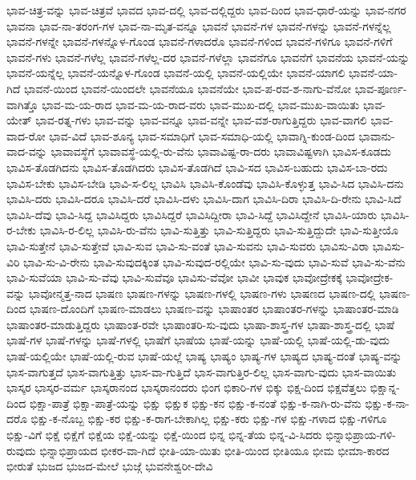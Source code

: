 {ಭಾವ-ಚಿತ್ರ-ವನ್ನು
ಭಾವ-ಚಿತ್ರವೆ
ಭಾವದ
ಭಾವ-ದಲ್ಲಿ
ಭಾವ-ದಲ್ಲಿದ್ದರು
ಭಾವ-ದಿಂದ
ಭಾವ-ಧಾರೆ-ಯನ್ನು
ಭಾವ-ನಗರ
ಭಾವನಾ
ಭಾವ-ನಾ-ತರಂಗ-ಗಳ
ಭಾವ-ನಾ-ಮೃತ-ವನ್ನೂ
ಭಾವನೆ
ಭಾವನೆ-ಗಳ
ಭಾವನೆ-ಗಳನ್ನು
ಭಾವನೆ-ಗಳನ್ನೆಲ್ಲ
ಭಾವನೆ-ಗಳನ್ನೇ
ಭಾವನೆ-ಗಳನ್ನೊಳ-ಗೊಂಡ
ಭಾವನೆ-ಗಳಾದರೊ
ಭಾವನೆ-ಗಳಿಂದ
ಭಾವನೆ-ಗಳಿಗೂ
ಭಾವನೆ-ಗಳಿಗೆ
ಭಾವನೆ-ಗಳು
ಭಾವನೆ-ಗಳೆಲ್ಲ
ಭಾವನೆ-ಗಳೆಲ್ಲ-ದರ
ಭಾವನೆ-ಗಳೆಲ್ಲಾ
ಭಾವನೆಗೂ
ಭಾವನೆಗೆ
ಭಾವನೆಯ
ಭಾವನೆ-ಯನ್ನು
ಭಾವನೆ-ಯನ್ನೆಲ್ಲ
ಭಾವನೆ-ಯನ್ನೊಳ-ಗೊಂಡ
ಭಾವನೆ-ಯಲ್ಲಿ
ಭಾವನೆ-ಯಲ್ಲಿಯೇ
ಭಾವನೆ-ಯಾಗಲಿ
ಭಾವನೆ-ಯಾ-ಗಿದೆ
ಭಾವನೆ-ಯಿಂದ
ಭಾವನೆ-ಯಿಂದಲೇ
ಭಾವನೆಯೂ
ಭಾವನೆಯೇ
ಭಾವ-ಪ-ರವ-ಶ-ನಾಗು-ವೆನೋ
ಭಾವ-ಪೂರ್ಣ-ವಾಗಿತ್ತೊ
ಭಾವ-ಮ-ಯ-ರಾದ
ಭಾವ-ಮ-ಯ-ರಾದ-ವರು
ಭಾವ-ಮುಖ-ದಲ್ಲಿ
ಭಾವ-ಮುಖ-ವಾಯಿತು
ಭಾವ-ಯೇತ್
ಭಾವ-ರತ್ನ-ಗಳು
ಭಾವ-ವನ್ನು
ಭಾವ-ವನ್ನೂ
ಭಾವ-ವನ್ನೇ
ಭಾವ-ವಶ-ರಾಗುತ್ತಿದ್ದರು
ಭಾವ-ವಾಗಲಿ
ಭಾವ-ವಾದ-ರೋ
ಭಾವ-ವಿದೆ
ಭಾವ-ಶೂನ್ಯ
ಭಾವ-ಸಮಾಧಿಗೆ
ಭಾವ-ಸಮಾಧಿ-ಯಲ್ಲಿ
ಭಾವಾಗ್ನಿ-ಕುಂಡ-ದಿಂದ
ಭಾವಾನು-ವಾದ-ವನ್ನು
ಭಾವಾವಸ್ಥೆಗೆ
ಭಾವಾವಸ್ಥೆ-ಯಲ್ಲಿ-ರು-ವೆನು
ಭಾವಾವಿಷ್ಟ-ರಾ-ದರು
ಭಾವಾವಿಷ್ಟಳಾಗಿ
ಭಾವಿಸ-ಕೂಡದು
ಭಾವಿಸ-ತೊಡಗಿದನು
ಭಾವಿಸ-ತೊಡಗಿದರು
ಭಾವಿಸ-ತೊಡಗಿದೆ
ಭಾವಿ-ಸದ
ಭಾವಿಸ-ಬಹುದು
ಭಾವಿಸ-ಬಾ-ರದು
ಭಾವಿಸ-ಬೇಕು
ಭಾವಿಸ-ಬೇಡಿ
ಭಾವಿ-ಸ-ಲಿಲ್ಲ
ಭಾವಿಸಿ
ಭಾವಿಸಿ-ಕೊಂಡೆವು
ಭಾವಿಸಿ-ಕೊಳ್ಳುತ್ತ
ಭಾವಿ-ಸಿದ
ಭಾವಿಸಿ-ದನು
ಭಾವಿಸಿ-ದರು
ಭಾವಿಸಿ-ದರೂ
ಭಾವಿಸಿ-ದರೆ
ಭಾವಿಸಿ-ದಳು
ಭಾವಿಸಿ-ದಾಗ
ಭಾವಿಸಿ-ದಿರಾ
ಭಾವಿಸಿ-ದಿ-ರೇನು
ಭಾವಿ-ಸಿದೆ
ಭಾವಿಸಿ-ದೆವು
ಭಾವಿ-ಸಿದ್ದ
ಭಾವಿಸಿದ್ದರು
ಭಾವಿಸಿದ್ದರೆ
ಭಾವಿಸಿದ್ದೀರಾ
ಭಾವಿ-ಸಿದ್ದೆ
ಭಾವಿಸಿದ್ದೇನೆ
ಭಾವಿಸಿ-ಯಾರು
ಭಾವಿಸಿ-ರ-ಬೇಕು
ಭಾವಿಸಿ-ರ-ಲಿಲ್ಲ
ಭಾವಿಸಿ-ರು-ವೆನು
ಭಾವಿ-ಸುತ್ತಿತ್ತು
ಭಾವಿ-ಸುತ್ತಿದ್ದರು
ಭಾವಿ-ಸುತ್ತಿದ್ದುದೇ
ಭಾವಿ-ಸುತ್ತೀಯೊ
ಭಾವಿ-ಸುತ್ತೇನೆ
ಭಾವಿ-ಸುತ್ತೇವೆ
ಭಾವಿ-ಸುವ
ಭಾವಿ-ಸು-ವಂತೆ
ಭಾವಿ-ಸುವನು
ಭಾವಿ-ಸುವರು
ಭಾವಿಸು-ವಿರಾ
ಭಾವಿಸು-ವಿರಿ
ಭಾವಿ-ಸು-ವಿ-ರೇನು
ಭಾವಿ-ಸುವುದಕ್ಕಿಂತ
ಭಾವಿ-ಸುವುದ-ರಲ್ಲಿಯೇ
ಭಾವಿ-ಸು-ವುದು
ಭಾವಿ-ಸುವೆ
ಭಾವಿ-ಸು-ವೆನು
ಭಾವಿ-ಸುವೆಯಾ
ಭಾವಿ-ಸು-ವೆವು
ಭಾವಿ-ಸುವೆವೂ
ಭಾವಿಸು-ವೆವೋ
ಭಾವೀ
ಭಾವುಕ
ಭಾವೋದ್ರೇಕಕ್ಕೆ
ಭಾವೋದ್ರೇಕ-ವನ್ನು
ಭಾವೋನ್ಮತ್ತ-ನಾದ
ಭಾಷಣ
ಭಾಷಣ-ಗಳನ್ನು
ಭಾಷಣ-ಗಳಲ್ಲಿ
ಭಾಷಣ-ಗಳು
ಭಾಷಣದ
ಭಾಷಣ-ದಲ್ಲಿ
ಭಾಷಣ-ದಿಂದ
ಭಾಷಣ-ದೊಂದಿಗೆ
ಭಾಷಣ-ಮಾಡಲು
ಭಾಷಣ-ವನ್ನು
ಭಾಷಾಂತರ
ಭಾಷಾಂತರ-ಗಳನ್ನು
ಭಾಷಾಂತರ-ಮಾಡಿ
ಭಾಷಾಂತರ-ಮಾಡುತ್ತಿದ್ದರು
ಭಾಷಾಂತ-ರವೇ
ಭಾಷಾಂತರಿ-ಸು-ವುದು
ಭಾಷಾ-ಶಾಸ್ತ್ರ-ಗಳ
ಭಾಷಾ-ಶಾಸ್ತ್ರ-ದಲ್ಲಿ
ಭಾಷೆ
ಭಾಷೆ-ಗಳ
ಭಾಷೆ-ಗಳನ್ನು
ಭಾಷೆ-ಗಳಲ್ಲಿ
ಭಾಷೆಗೆ
ಭಾಷೆಯ
ಭಾಷೆ-ಯನ್ನು
ಭಾಷೆ-ಯಲ್ಲಿ
ಭಾಷೆ-ಯಲ್ಲಿ-ಡು-ವುದು
ಭಾಷೆ-ಯಲ್ಲಿಯೇ
ಭಾಷೆ-ಯಲ್ಲಿ-ರುವ
ಭಾಷೆ-ಯಲ್ಲೆ
ಭಾಷ್ಯ
ಭಾಷ್ಯಂ
ಭಾಷ್ಯ-ಗಳ
ಭಾಷ್ಯದ
ಭಾಷ್ಯ-ದಂತೆ
ಭಾಷ್ಯ-ವನ್ನು
ಭಾಸ-ವಾಗುತ್ತದೆ
ಭಾಸ-ವಾಗುತ್ತಿತ್ತು
ಭಾಸ-ವಾ-ಗುತ್ತಿದೆ
ಭಾಸ-ವಾಗುತ್ತಿರ-ಲಿಲ್ಲ
ಭಾಸ-ವಾಗು-ವುದು
ಭಾಸ-ವಾಯಿತು
ಭಾಸ್ಕರ
ಭಾಸ್ಕರ-ವರ್ಮ
ಭಾಸ್ಕರಾನಂದ
ಭಾಸ್ಕರಾನಂದರು
ಭಿಂಗ
ಭಿಕಾರಿ-ಗಳ
ಭಿಕ್ಕು
ಭಿಕ್ಷ-ದಿಂದ
ಭಿಕ್ಷವೆತ್ತಲು
ಭಿಕ್ಷಾನ್ನ-ದಿಂದ
ಭಿಕ್ಷಾ-ಪಾತ್ರೆ
ಭಿಕ್ಷಾ-ಪಾತ್ರೆ-ಯನ್ನು
ಭಿಕ್ಷು
ಭಿಕ್ಷುಕ
ಭಿಕ್ಷು-ಕನ
ಭಿಕ್ಷು-ಕ-ನಂತೆ
ಭಿಕ್ಷು-ಕ-ನಾಗಿ-ರು-ವೆನು
ಭಿಕ್ಷು-ಕ-ನಾ-ದರೊ
ಭಿಕ್ಷು-ಕ-ನೊಬ್ಬ
ಭಿಕ್ಷು-ಕರ
ಭಿಕ್ಷು-ಕ-ರಾಗ-ಬೇಕಾಗಿಲ್ಲ
ಭಿಕ್ಷು-ಕರು
ಭಿಕ್ಷು-ಗಳ
ಭಿಕ್ಷು-ಗಳಾದ
ಭಿಕ್ಷು-ಗಳಿಗೂ
ಭಿಕ್ಷು-ವಿಗೆ
ಭಿಕ್ಷೆ
ಭಿಕ್ಷೆಗೆ
ಭಿಕ್ಷೆಯ
ಭಿಕ್ಷೆ-ಯನ್ನು
ಭಿಕ್ಷೆ-ಯಿಂದ
ಭಿನ್ನ
ಭಿನ್ನ-ತೆಯ
ಭಿನ್ನ-ವಿ-ಸಿದರು
ಭಿನ್ನಾಭಿಪ್ರಾಯ-ಗಳಿ-ರುವುದು
ಭಿನ್ನಾಭಿಪ್ರಾಯದ
ಭೀಕರ-ವಾ-ಗಿದೆ
ಭೀತಿ-ಯಾ-ಯಿತು
ಭೀತಿ-ಯಿಂದ
ಭೀತಿಯೂ
ಭೀಮ
ಭೀಮಾ-ಕಾರದ
ಭೀರುತೆ
ಭುಜದ
ಭುಜದ-ಮೇಲೆ
ಭುಜ್ಗೆ
ಭುವನೇಶ್ವರೀ-ದೇವಿ
}
